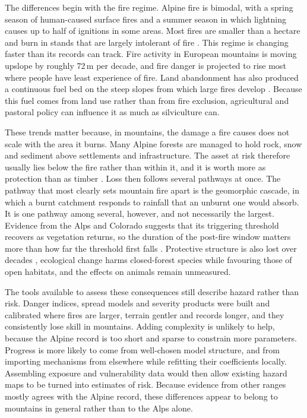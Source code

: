 \documentclass[11pt,a4paper]{article}
\begin{document}
The differences begin with the fire regime. Alpine fire is bimodal, with a spring season of human-caused surface fires and a summer season in which lightning causes up to half of ignitions in some areas. Most fires are smaller than a hectare and burn in stands that are largely intolerant of fire \citep{muller_forest_2020, valese_wildfires_2011, mutterer_bark_2026}. This regime is changing faster than its records can track. Fire activity in European mountains is moving upslope by roughly 72\,m per decade, and fire danger is projected to rise most where people have least experience of fire. Land abandonment has also produced a continuous fuel bed on the steep slopes from which large fires develop \citep{beloiu_climatedriven_2026, gerberding_mapping_2025, conedera_linking_2024}. Because this fuel comes from land use rather than from fire exclusion, agricultural and pastoral policy can influence it as much as silviculture can.

These trends matter because, in mountains, the damage a fire causes does not scale with the area it burns. Many Alpine forests are managed to hold rock, snow and sediment above settlements and infrastructure. The asset at risk therefore usually lies below the fire rather than within it, and it is worth more as protection than as timber \citep{accastello_asforesee_2019, moos_climate_2021}. Loss then follows several pathways at once. The pathway that most clearly sets mountain fire apart is the geomorphic cascade, in which a burnt catchment responds to rainfall that an unburnt one would absorb. It is one pathway among several, however, and not necessarily the largest. Evidence from the Alps and Colorado suggests that its triggering threshold recovers as vegetation returns, so the duration of the post-fire window matters more than how far the threshold first falls \citep{laporta_postwildfire_2025, rengers_evaluating_2024}. Protective structure is also lost over decades \citep{gehring_shallow_2019}, ecological change harms closed-forest species while favouring those of open habitats, and the effects on animals remain unmeasured.

The tools available to assess these consequences still describe hazard rather than risk. Danger indices, spread models and severity products were built and calibrated where fires are larger, terrain gentler and records longer, and they consistently lose skill in mountains. Adding complexity is unlikely to help, because the Alpine record is too short and sparse to constrain more parameters. Progress is more likely to come from well-chosen model structure, and from importing mechanisms from elsewhere while refitting their coefficients locally. Assembling exposure and vulnerability data would then allow existing hazard maps to be turned into estimates of risk. Because evidence from other ranges mostly agrees with the Alpine record, these differences appear to belong to mountains in general rather than to the Alps alone.
\end{document}
